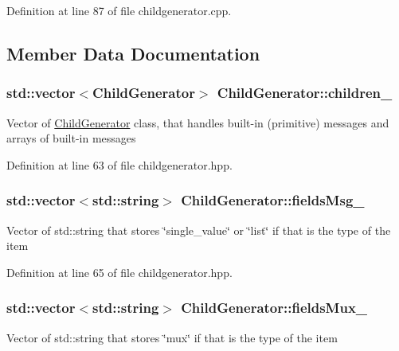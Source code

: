 Definition at line 87 of file childgenerator.\-cpp.



\subsection{Member Data Documentation}
\hypertarget{classChildGenerator_ab54bc0742dc6acaf310afb296a154a96}{
\subsubsection[{children\-\_\-}]{\setlength{\rightskip}{0pt plus 5cm}std\-::vector$<${\bf Child\-Generator}$>$ Child\-Generator\-::children\-\_\-\hspace{0.3cm}{\ttfamily [private]}}}\label{classChildGenerator_ab54bc0742dc6acaf310afb296a154a96}
Vector of \hyperlink{classChildGenerator}{Child\-Generator} class, that handles built-\/in (primitive) messages and arrays of built-\/in messages 

Definition at line 63 of file childgenerator.\-hpp.

\hypertarget{classChildGenerator_a6e4d1e3a323027b3e4277b385b483688}{
\subsubsection[{fields\-Msg\-\_\-}]{\setlength{\rightskip}{0pt plus 5cm}std\-::vector$<$std\-::string$>$ Child\-Generator\-::fields\-Msg\-\_\-\hspace{0.3cm}{\ttfamily [private]}}}\label{classChildGenerator_a6e4d1e3a323027b3e4277b385b483688}
Vector of std\-::string that stores \char`\"{}single\-\_\-value\char`\"{} or \char`\"{}list\char`\"{} if that is the type of the item 

Definition at line 65 of file childgenerator.\-hpp.

\hypertarget{classChildGenerator_aeb69f47a9b38b931c8c8fdef61d0a4eb}{
\subsubsection[{fields\-Mux\-\_\-}]{\setlength{\rightskip}{0pt plus 5cm}std\-::vector$<$std\-::string$>$ Child\-Generator\-::fields\-Mux\-\_\-\hspace{0.3cm}{\ttfamily [private]}}}\label{classChildGenerator_aeb69f47a9b38b931c8c8fdef61d0a4eb}
Vector of std\-::string that stores \char`\"{}mux\char`\"{} if that is the type of the item 

